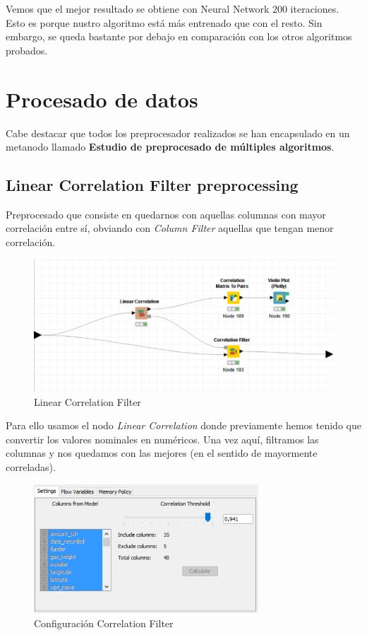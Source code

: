 	Vemos que el mejor resultado se obtiene con Neural Network 200 iteraciones. Esto es porque nustro algoritmo está más entrenado que con el resto. Sin embargo, se queda bastante por debajo en comparación con los otros algoritmos probados.

	\section{Procesado de datos}
	
	\hspace{1cm} Cabe destacar que todos los preprocesador realizados se han encapsulado en un metanodo llamado \textbf{Estudio de preprocesado de múltiples algoritmos}.
			
	\subsection{Linear Correlation Filter preprocessing}
	
	\hspace{1cm} Preprocesado que consiste en quedarnos con aquellas columnas con mayor correlación entre sí, obviando con \textit{Column Filter} aquellas que tengan menor correlación. 
	
	
	\begin{figure}[H]
		\centering
		\includegraphics[width=1\textwidth]{img/linear.png}
		\caption{Linear Correlation Filter}
	\end{figure}
	
	
	Para ello usamos el nodo \textit{Linear Correlation} donde previamente hemos tenido que convertir los valores nominales en numéricos. Una vez aquí, filtramos las columnas y nos quedamos con las mejores (en el sentido de mayormente correladas).
	

	\begin{figure}[H]
		\centering
		\includegraphics[width=0.75\textwidth]{img/correla.png}
		\caption{Configuración Correlation Filter}
	\end{figure}



